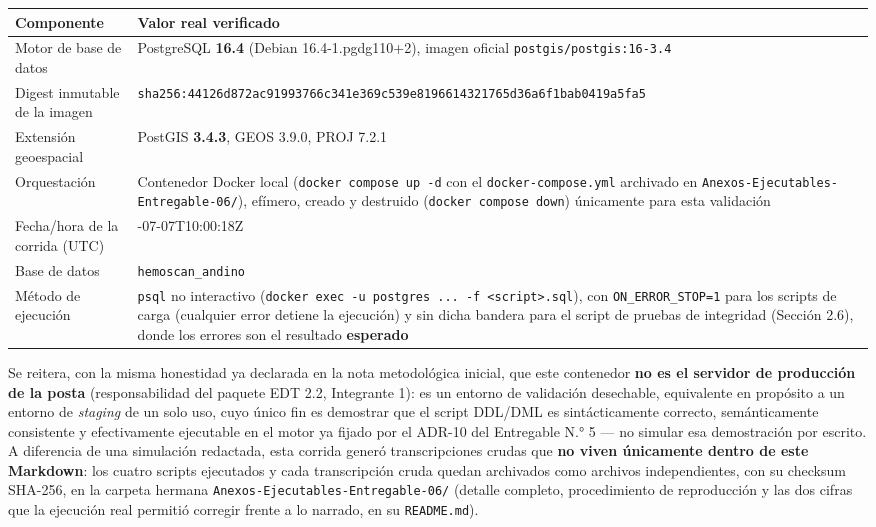 \documentclass[11pt,a4paper]{article}
\begin{document}
{\small
\begin{longtable}[]{@{}
  >{\raggedright\arraybackslash}p{}
  >{\raggedright\arraybackslash}p{}@{}}
\toprule\noalign{}
\begin{minipage}[b]{\linewidth}\raggedright
Componente
\end{minipage} & \begin{minipage}[b]{\linewidth}\raggedright
Valor real verificado
\end{minipage} \\
\midrule\noalign{}
\endhead
\bottomrule\noalign{}
\endlastfoot
Motor de base de datos & PostgreSQL \textbf{16.4} (Debian 16.4-1.pgdg110+2), imagen oficial \texttt{postgis/postgis:16-3.4} \\
Digest inmutable de la imagen & \texttt{sha256:44126d872ac91993766c341e369c539e8196614321765d36a6f1bab0419a5fa5} \\
Extensión geoespacial & PostGIS \textbf{3.4.3}, GEOS 3.9.0, PROJ 7.2.1 \\
Orquestación & Contenedor Docker local (\texttt{docker\ compose\ up\ -d} con el \texttt{docker-compose.yml} archivado en \texttt{Anexos-Ejecutables-Entregable-06/}), efímero, creado y destruido (\texttt{docker\ compose\ down}) únicamente para esta validación \\
Fecha/hora de la corrida (UTC) & 2026-07-07T10:00:18Z \\
Base de datos & \texttt{hemoscan\_andino} \\
Método de ejecución & \texttt{psql} no interactivo (\texttt{docker\ exec\ -u\ postgres\ ...\ -f\ \textless{}script\textgreater{}.sql}), con \texttt{ON\_ERROR\_STOP=1} para los scripts de carga (cualquier error detiene la ejecución) y sin dicha bandera para el script de pruebas de integridad (Sección 2.6), donde los errores son el resultado \textbf{esperado} \\
\end{longtable}
}

Se reitera, con la misma honestidad ya declarada en la nota metodológica inicial, que este contenedor \textbf{no es el servidor de producción de la posta} (responsabilidad del paquete EDT 2.2, Integrante 1): es un entorno de validación desechable, equivalente en propósito a un entorno de \emph{staging} de un solo uso, cuyo único fin es demostrar que el script DDL/DML es sintácticamente correcto, semánticamente consistente y efectivamente ejecutable en el motor ya fijado por el ADR-10 del Entregable N.° 5 --- no simular esa demostración por escrito. A diferencia de una simulación redactada, esta corrida generó transcripciones crudas que \textbf{no viven únicamente dentro de este Markdown}: los cuatro scripts ejecutados y cada transcripción cruda quedan archivados como archivos independientes, con su checksum SHA-256, en la carpeta hermana \texttt{Anexos-Ejecutables-Entregable-06/} (detalle completo, procedimiento de reproducción y las dos cifras que la ejecución real permitió corregir frente a lo narrado, en su \texttt{README.md}).
\end{document}
